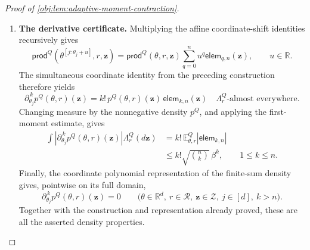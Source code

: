 \documentclass[11pt]{article}
\begin{document}
\begin{proof}[Proof of \cref{obj:lem:adaptive-moment-contraction}]
\begin{enumerate}
The nonnegative centered square gives
\[
\begin{split}
0
&\le
\mathbb E^Q_{\theta,r}
 \left[
 \left(
 |\mathsf{elem}_{k,v}|
 -\mathbb E^Q_{\theta,r}|\mathsf{elem}_{k,v}|
 \right)^2
 \right]\\
&=
\mathbb E^Q_{\theta,r}[\mathsf{elem}_{k,v}^2]
-\left(\mathbb E^Q_{\theta,r}|\mathsf{elem}_{k,v}|\right)^2.
\end{split}
\]
Since \(\beta\ge0\), it follows that
\[
\mathbb E^Q_{\theta,r}|\mathsf{elem}_{k,v}|
\le\sqrt{\binom vk}\,\beta^k.
\]

\item \textbf{The derivative certificate.}
Multiplying the affine coordinate-shift identities recursively gives
\[
\mathsf{prod}^Q(\theta^{[j:\theta_j+u]},r,\mathbf z)
=
\mathsf{prod}^Q(\theta,r,\mathbf z)
\sum_{q=0}^n u^q\mathsf{elem}_{q,n}(\mathbf z),
\qquad u\in\mathbb R.
\]
The simultaneous coordinate identity from the preceding construction therefore yields
\[
\partial_{\theta_j}^{\,k}p^Q(\theta,r)(\mathbf z)
=
k!\,p^Q(\theta,r)(\mathbf z)\,
\mathsf{elem}_{k,n}(\mathbf z)
\quad
\Lambda_r^Q\text{-almost everywhere}.
\]
Changing measure by the nonnegative density \(p^Q\), and applying the first-moment estimate, gives
\[
\begin{split}
\int
\left|\partial_{\theta_j}^{\,k}p^Q(\theta,r)(\mathbf z)\right|
 \Lambda_r^Q(d\mathbf z)
&=
k!\,\mathbb E^Q_{\theta,r}|\mathsf{elem}_{k,n}|\\
&\le k!\sqrt{\binom nk}\,\beta^k,
\qquad 1\le k\le n.
\end{split}
\]
Finally, the coordinate polynomial representation of the finite-sum density gives, pointwise on its full domain,
\[
\partial_{\theta_j}^{\,k}p^Q(\theta,r)(\mathbf z)=0
\qquad
\bigl(\theta\in\mathbb R^d,\ r\in\mathcal R,\
\mathbf z\in\mathcal Z,\ j\in[d],\ k>n\bigr).
\]
Together with the construction and representation already proved, these are all the asserted density properties.


\end{enumerate}
\end{proof}
\end{document}

